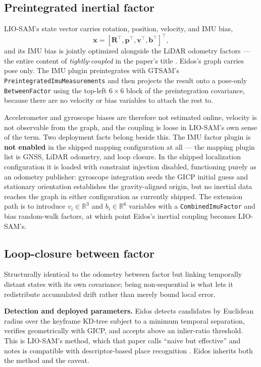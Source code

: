\documentclass[conference]{IEEEtran}
\begin{document}
\subsection{Preintegrated inertial factor}
LIO-SAM's state vector carries rotation, position, velocity, and IMU bias,
\begin{equation}
\mathbf{x} = [\mathbf{R}^\top, \mathbf{p}^\top, \mathbf{v}^\top, \mathbf{b}^\top]^\top,
\end{equation}
and its IMU bias is jointly optimized alongside the LiDAR odometry factors --- the entire content of \emph{tightly-coupled} in the paper's title \parencite{shan2020liosam}. Eidos's graph carries pose only. The IMU plugin preintegrates with GTSAM's \texttt{PreintegratedImuMeasurements} \parencite{forster2017onmanifold} and then projects the result onto a pose-only \texttt{BetweenFactor} using the top-left $6\times6$ block of the preintegration covariance, because there are no velocity or bias variables to attach the rest to.

Accelerometer and gyroscope biases are therefore not estimated online, velocity is not observable from the graph, and the coupling is loose in LIO-SAM's own sense of the term. Two deployment facts belong beside this. The IMU factor plugin is \textbf{not enabled} in the shipped mapping configuration at all --- the mapping plugin list is GNSS, LiDAR odometry, and loop closure. In the shipped localization configuration it is loaded with constraint injection disabled, functioning purely as an odometry publisher: gyroscope integration seeds the GICP initial guess and stationary orientation establishes the gravity-aligned origin, but no inertial data reaches the graph in either configuration as currently shipped. The extension path is to introduce $v_i \in \mathbb{R}^3$ and $b_i \in \mathbb{R}^6$ variables with a \texttt{CombinedImuFactor} and bias random-walk factors, at which point Eidos's inertial coupling becomes LIO-SAM's.

\subsection{Loop-closure between factor}
Structurally identical to the odometry between factor but linking temporally distant states with its own covariance; being non-sequential is what lets it redistribute accumulated drift rather than merely bound local error.

\textbf{Detection and deployed parameters.} Eidos detects candidates by Euclidean radius over the keyframe KD-tree subject to a minimum temporal separation, verifies geometrically with GICP, and accepts above an inlier-ratio threshold. This is LIO-SAM's method, which that paper calls ``naive but effective'' and notes is compatible with descriptor-based place recognition \parencite{shan2020liosam}. Eidos inherits both the method and the caveat.
\end{document}
